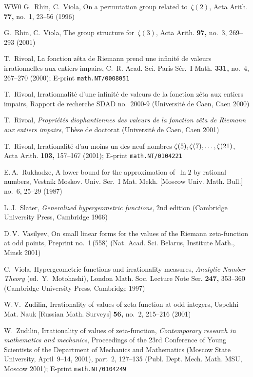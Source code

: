 \documentclass[a4paper,twoside]{article}
\numberwithin{equation}{section}
\renewcommand{\[}{\lfloor}
\renewcommand{\]}{\rfloor}
\newcommand{\<}{\langle}
\renewcommand{\>}{\rangle}
\begin{document}
\begin{thebibliography}{WW0}
G.~Rhin, C.~Viola,
On a permutation group related to~$\zeta(2)$,
Acta Arith. \textbf{77,} no.~1, 23--56 (1996)

G.~Rhin, C.~Viola,
The group structure for~$\zeta(3)$,
Acta Arith. \textbf{97,} no.~3, 269--293 (2001)

T.~Rivoal,
La fonction z\^eta de Riemann prend une infinit\'e
de valeurs irrationnelles aux entiers impairs,
C.~R. Acad. Sci. Paris S\'er.~I Math. \textbf{331,} no.~4, 267--270 (2000);
E-print \texttt{math.NT/0008051}

T.~Rivoal,
Irrationnalit\'e d'une infinit\'e de valeurs
de la fonction z\^eta aux entiers impairs,
Rapport de recherche SDAD no.~2000-9
(Universit\'e de Caen, Caen 2000)

T.~Rivoal,
\textit{Propri\'et\'es diophantiennes des valeurs
de la fonction z\^eta de Riemann aux entiers impairs},
Th\`ese de doctorat
(Universit\'e de Caen, Caen 2001)

T.~Rivoal,
Irrationalit\'e d'au moins un des neuf nombres
$\zeta(5),\zeta(7),\dots,\linebreak[2]\zeta(21)$,
Acta Arith. \textbf{103,} 157--167 (2001);
E-print \texttt{math.NT/0104221}

E.\,A.~Rukhadze,
A lower bound for the approximation of~$\ln2$ by rational numbers,
Vestnik Moskov. Univ. Ser.~I Mat. Mekh. [Moscow Univ. Math. Bull.]
no.~6, 25--29 (1987)

L.\,J.~Slater,
\textit{Generalized hypergeometric functions},
2nd edition (Cambridge University Press, Cambridge 1966)

D.\,V.~Vasilyev,
On small linear forms for the values of the Riemann
zeta-function at odd points,
Preprint no.~1\,(558)
(Nat. Acad. Sci. Belarus, Institute Math., Minsk 2001)

C.~Viola,
Hypergeometric functions and irrationality measures,
\textit{Analytic Number Theory\/} (ed.~Y.~Motohashi),
London Math. Soc. Lecture Note Ser. \textbf{247,} 353--360
(Cambridge University Press, Cambridge 1997)

W.\,V.~Zudilin,
Irrationality of values of zeta function at odd integers,
Uspekhi Mat. Nauk [Russian Math. Surveys] \textbf{56,} no.~2, 215--216 (2001)

W.~Zudilin,
Irrationality of values of zeta-function,
\textit{Contemporary research in mathematics and mechanics},
Proceedings of the 23rd Conference of Young Scientists
of the Department of Mechanics and Mathematics
(Moscow State University, April~9--14, 2001),
part~2, 127--135
(Publ. Dept. Mech. Math. MSU, Moscow 2001);
E-print \texttt{math.NT/0104249}


\end{thebibliography}
\end{document}
